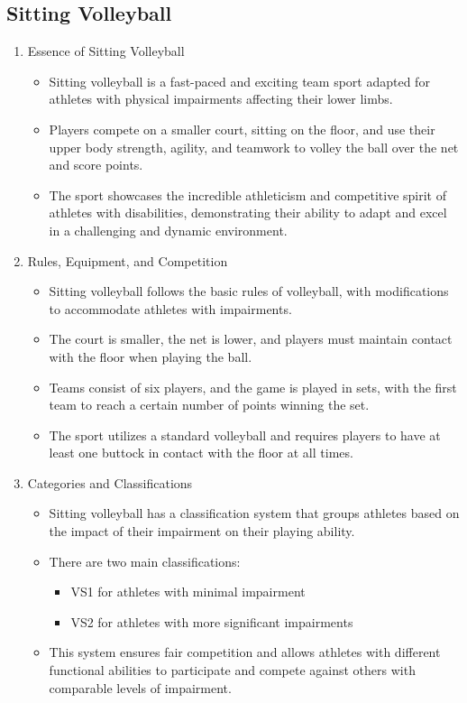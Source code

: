 \subsection{Sitting Volleyball}

\begin{enumerate}

\item Essence of Sitting Volleyball
    \begin{itemize}
    \item Sitting volleyball is a fast-paced and exciting team sport adapted for athletes with physical impairments affecting their lower limbs. 
    \item Players compete on a smaller court, sitting on the floor, and use their upper body strength, agility, and teamwork to volley the ball over the net and score points. 
    \item The sport showcases the incredible athleticism and competitive spirit of athletes with disabilities, demonstrating their ability to adapt and excel in a challenging and dynamic environment.
    \end{itemize}

\item Rules, Equipment, and Competition
    \begin{itemize}
    \item Sitting volleyball follows the basic rules of volleyball, with modifications to accommodate athletes with impairments. 
    \item The court is smaller, the net is lower, and players must maintain contact with the floor when playing the ball. 
    \item Teams consist of six players, and the game is played in sets, with the first team to reach a certain number of points winning the set. 
    \item The sport utilizes a standard volleyball and requires players to have at least one buttock in contact with the floor at all times.
    \end{itemize}

\item Categories and Classifications
    \begin{itemize}
    \item Sitting volleyball has a classification system that groups athletes based on the impact of their impairment on their playing ability. 
    \item There are two main classifications:  
        \begin{itemize}
        \item VS1 for athletes with minimal impairment
        \item VS2 for athletes with more significant impairments
        \end{itemize}
    \item This system ensures fair competition and allows athletes with different functional abilities to participate and compete against others with comparable levels of impairment.
    \end{itemize}

\end{enumerate}